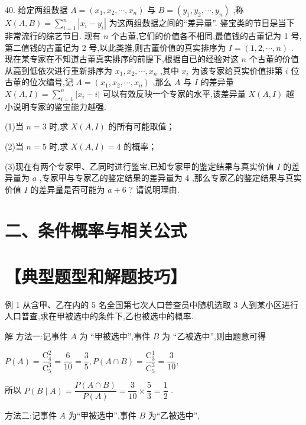 40. 给定两组数据 $A = \left( {{x}_{1},{x}_{2},\cdots ,{x}_{n}}\right)$ 与 $B = \left( {{y}_{1},{y}_{2},\cdots ,{y}_{n}}\right)$ ,称 $X\left( {A,B}\right)  = \mathop{\sum }\limits_{{i = 1}}^{n}\left| {{x}_{i} - {y}_{i}}\right|$ 为这两组数据之间的“差异量”. 鉴宝类的节目是当下非常流行的综艺节目. 现有 $n$ 个古董,它们的价值各不相同,最值钱的古董记为 1 号,第二值钱的古董记为 2 号,以此类推,则古董价值的真实排序为 $I = \left( {1,2,\cdots ,n}\right)$ . 现在某专家在不知道古董真实排序的前提下,根据自已的经验对这 $n$ 个古董的价值从高到低依次进行重新排序为 ${x}_{1},{x}_{2},\cdots ,{x}_{n}$ ,其中 ${x}_{i}$ 为该专家给真实价值排第 $i$ 位古董的位次编号,记 $A = \left( {{x}_{1},{x}_{2},\cdots ,{x}_{n}}\right)$ ,那么 $A$ 与 $I$ 的差异量 $X\left( {A,I}\right)  = \mathop{\sum }\limits_{{i = 1}}^{n}\left| {{x}_{i} - i}\right|$ 可以有效反映一个专家的水平,该差异量 $X\left( {A,I}\right)$ 越小说明专家的鉴宝能力越强.

(1)当 $n = 3$ 时,求 $X\left( {A,I}\right)$ 的所有可能取值；

(2)当 $n = 5$ 时,求 $X\left( {A,I}\right)  = 4$ 的概率；

(3)现在有两个专家甲、乙同时进行鉴宝,已知专家甲的鉴定结果与真实价值 $I$ 的差异量为 $a$ ,专家甲与专家乙的鉴定结果的差异量为 4 ,那么专家乙的鉴定结果与真实价值 $I$ 的差异量是否可能为 $a + 6$ ? 请说明理由.

\section*{二、条件概率与相关公式}

\section*{【典型题型和解题技巧】}

例 1 从含甲、乙在内的 5 名全国第七次人口普查员中随机选取 3 人到某小区进行人口普查,求在甲被选中的条件下,乙也被选中的概率.

解 方法一:记事件 $A$ 为 “甲被选中”,事件 $B$ 为 “乙被选中”,则由题意可得

$P\left( A\right)  = \dfrac{{\mathrm{C}}_{4}^{2}}{{\mathrm{C}}_{5}^{3}} = \dfrac{6}{10} = \dfrac{3}{5},P\left( {A \cap  B}\right)  = \dfrac{{\mathrm{C}}_{3}^{1}}{{\mathrm{C}}_{5}^{3}} = \dfrac{3}{10},$

所以 $P\left( {B \mid  A}\right)  = \dfrac{P\left( {A \cap  B}\right) }{P\left( A\right) } = \dfrac{3}{10} \times  \dfrac{5}{3} = \dfrac{1}{2}$ .

方法二:记事件 $A$ 为“甲被选中”,事件 $B$ 为“乙被选中”,

